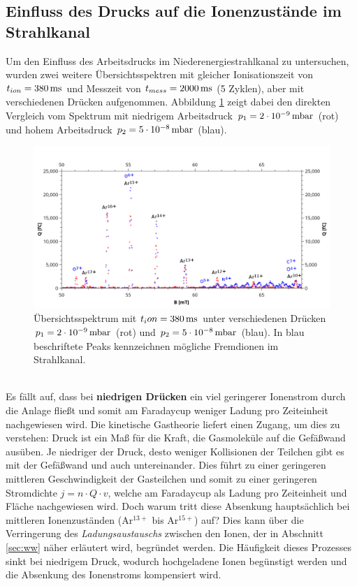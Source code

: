 	\subsection{Einfluss des Drucks auf die Ionenzustände im Strahlkanal}
		Um den Einfluss des Arbeitsdrucks im Niederenergiestrahlkanal zu untersuchen, wurden zwei weitere Übersichtsspektren mit gleicher Ionisationszeit von $t_{ion} = \unit[380]{ms}$ und Messzeit von $t_{mess} = \unit[2000]{ms}$ (5 Zyklen), aber mit verschiedenen Drücken aufgenommen. Abbildung \ref{fig:all} zeigt dabei den direkten Vergleich vom Spektrum mit niedrigem Arbeitsdruck $p_1 = \unit[2\cdot 10^{-9}]{mbar}$ (rot) und hohem Arbeitsdruck $p_2 = \unit[5\cdot 10^{-8}]{mbar}$ (blau).\\
		\begin{figure}[htb]
			\centering
			\includegraphics[width=\linewidth]{pic/all_beschriftet.png}
			\caption{Übersichtsspektrum mit $t_ion = \unit[380]{ms}$ unter verschiedenen Drücken $p_1 = \unit[2\cdot 10^{-9}]{mbar}$ (rot) und $p_2 = \unit[5\cdot 10^{-8}]{mbar}$ (blau). In blau beschriftete Peaks kennzeichnen mögliche Fremdionen im Strahlkanal.}
			\label{fig:all}	
		\end{figure}
		\ \\
		Es fällt auf, dass bei \textbf{niedrigen Drücken} ein viel geringerer Ionenstrom durch die Anlage fließt und somit am Faradaycup weniger Ladung pro Zeiteinheit nachgewiesen wird. Die kinetische Gastheorie liefert einen Zugang, um dies zu verstehen: Druck ist ein Maß für die Kraft, die Gasmoleküle auf die Gefäßwand ausüben. Je niedriger der Druck, desto weniger Kollisionen der Teilchen gibt es mit der Gefäßwand und auch untereinander. Dies führt zu einer geringeren mittleren Geschwindigkeit der Gasteilchen und somit zu einer geringeren Stromdichte $j = n\cdot Q \cdot v$, welche am Faradaycup als Ladung pro Zeiteinheit und Fläche nachgewiesen wird. Doch warum tritt diese Absenkung hauptsächlich bei mittleren Ionenzuständen (Ar$^{13+}$ bis Ar$^{15+}$) auf? Dies kann über die Verringerung des \textit{Ladungsaustauschs} zwischen den Ionen, der in Abschnitt \ref{sec:ww} näher erläutert wird, begründet werden. Die Häufigkeit dieses Prozesses sinkt bei niedrigem Druck, wodurch hochgeladene Ionen begünstigt werden und die Absenkung des Ionenstroms kompensiert wird.\\

